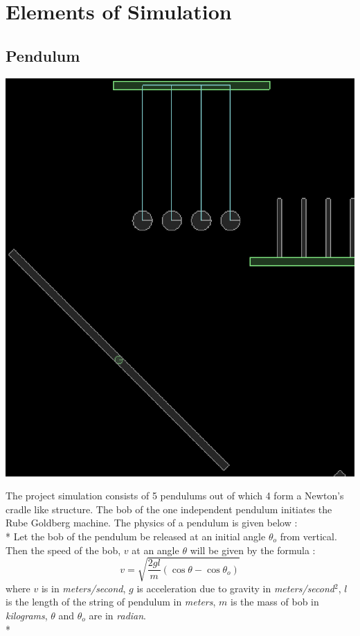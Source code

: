 \documentclass[11pt]{article}
\begin{document}
\section{Elements of Simulation}
\subsection{Pendulum}
\begin{center}
\includegraphics[scale=0.5]{pendulum}
\end{center}
The project simulation consists of 5 pendulums out of which 4 form a Newton's cradle like structure. The bob of the one independent pendulum initiates the Rube Goldberg machine. The physics of a pendulum is given below : \\*
Let the bob of the pendulum\cite{pendulum} be released at an initial angle $\theta_o$  from vertical. Then the speed of the bob, $v$ at an angle $\theta$  will be given by the formula :
\begin{equation}
                                                  v = \sqrt{\frac{2gl}{m}(\cos\theta - \cos\theta_o)}
\end{equation}
where $v$ is in \emph{meters/second}, $g$ is acceleration due to gravity in \emph{meters/second$^2$}, $l$ is the length of the string of pendulum in \emph{meters}, $m$ is the mass of bob in \emph{kilograms}, $\theta$ and $\theta_o$ are in \emph{radian}.\\*
\end{document}
